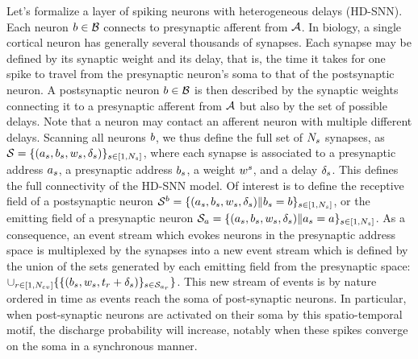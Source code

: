 \documentclass[default]{sn-jnl}%
\theoremstyle{thmstyleone}%
\theoremstyle{thmstyletwo}%
\theoremstyle{thmstylethree}%
\newcommand{\note}[1]{{\sethlcolor{yellow}\hl{#1}}}
\begin{document}
Let's formalize a layer of spiking neurons with heterogeneous delays (HD-SNN). Each neuron $b \in \mathcal{B}$  connects to presynaptic afferent from $\mathcal{A}$. In biology, a single cortical neuron has generally several thousands of synapses. Each synapse may be defined by its synaptic weight and its delay, that is, the time it takes for one spike to travel from the presynaptic neuron's soma to that of the postsynaptic neuron. A postsynaptic neuron $b \in \mathcal{B}$ is then described by the synaptic weights connecting it to a presynaptic afferent from $\mathcal{A}$ but also by the set of possible delays. Note that a neuron may contact an afferent neuron with multiple different delays. Scanning all neurons $b$, we thus define the full set of $N_{s}$ synapses, 
as  $\mathcal{S} = \{(a_s, b_s, w_s, \delta_s)\}_{s \in [1,N_{s}]}$, where each synapse is associated to a presynaptic address $a_s$, a presynaptic address $b_s$,  a weight $w^s$, and a delay $\delta_s$. This defines the full connectivity of the HD-SNN model. Of interest is to define the receptive field of a postsynaptic neuron $\mathcal{S}^b =  \{(a_s, b_s, w_s, \delta_s) \| b_s=b\}_{s \in [1,N_{s}]} $, or the emitting field of a presynaptic neuron $\mathcal{S}_a =  \{(a_s, b_s, w_s, \delta_s) \| a_s=a\}_{s \in [1,N_{s}]}$. As a consequence, an event stream which evokes neurons in the presynaptic address space is multiplexed by the synapses into a new event stream which is defined by the union of the sets generated by each emitting field from the presynaptic space: 
$ \cup_{r \in [1,N_{ev}]} \{ \{(b_s, w_s, t_r + \delta_s) \}_{ s \in \mathcal{S}_{a_r}} \}$. This new stream of events is by nature ordered in time as events reach the soma of post-synaptic neurons. In particular, when post-synaptic neurons are activated on their soma by this spatio-temporal motif, the discharge probability will increase, notably when these spikes converge on the soma in a synchronous manner. 
\end{document}
